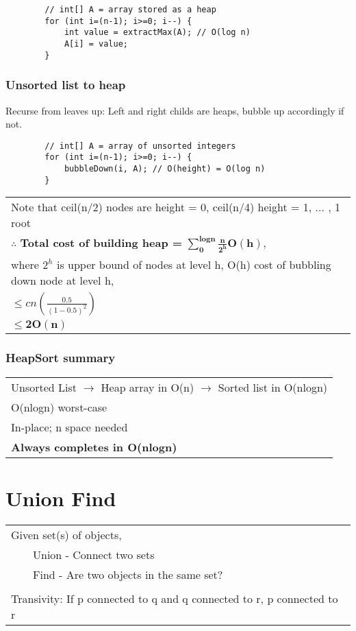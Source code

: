 \documentclass{article}
\newcommand{\tabitem}{~~\llap{\textbullet}~~}
\begin{document}
    \begin{verbatim}
        // int[] A = array stored as a heap
        for (int i=(n-1); i>=0; i--) {
            int value = extractMax(A); // O(log n)
            A[i] = value;
        }
    \end{verbatim}

    \subsubsection{Unsorted list to heap}

    Recurse from leaves up: Left and right childs are heaps, bubble up accordingly if not.

    \begin{verbatim}
        // int[] A = array of unsorted integers
        for (int i=(n-1); i>=0; i--) {
            bubbleDown(i, A); // O(height) = O(log n)
        }
    \end{verbatim}

    \begin{tabular}{l}
        Note that ceil(n/2) nodes are height = 0, ceil(n/4) height = 1, ... , 1 root\\
        $\therefore$ \textbf{Total cost of building heap = }$\bm{\sum_{0}^{logn}\frac{n}{2^{h}}O(h)}$,\\
        where $2^{h}$ is upper bound of nodes at level h, O(h) cost of bubbling down node at level h,\\
        $\leq cn(\frac{0.5}{(1-0.5)^{2}})$\\
        $\bm{\leq 2O(n)}$\\
    \end{tabular}

    \subsubsection{HeapSort summary}

    \begin{tabular}{l}
        Unsorted List $\rightarrow$ Heap array in O(n) $\rightarrow$ Sorted list in O(nlogn)\\
        O(nlogn) worst-case\\
        In-place; n space needed\\
        \textbf{Always completes in O(nlogn)}\\
    \end{tabular}

    \pagebreak

    \section{Union Find}
    \begin{tabular}{l}
        Given set(s) of objects,\\
        \tabitem Union - Connect two sets\\
        \tabitem Find - Are two objects in the same set?\\\\
        Transivity: If p connected to q and q connected to r, p connected to r\\
    \end{tabular}
\end{document}

